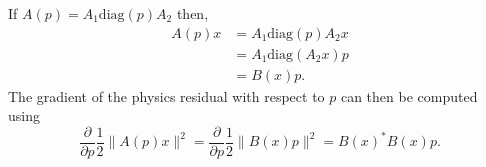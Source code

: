 \documentclass{article}
\newcommand{\be}{\begin{equation}}
\newcommand{\ee}{\end{equation}}
\newcommand{\inv}{\frac{1}}
\newcommand{\del}{\partial}
\newcommand{\der}[1]{\frac{\del}{\del #1}}
\newcommand{\diag}{\text{diag}}
\begin{document}
If $A(p) = A_1 \diag(p) A_2$ then,
\begin{align}
    A(p)x &= A_1 \diag(p) A_2 x \\
        &= A_1 \diag(A_2 x) p \\
        &= B(x) p. 
\end{align}
The gradient of the physics residual with respect to $p$ can then be computed using
\be \der{p} \inv{2} \|A(p)x\|^2 = \der{p} \inv{2} \|B(x)p\|^2 = B(x)^*B(x)p. \ee


\begin{thebibliography}{99}
\end{thebibliography}
\end{document}
